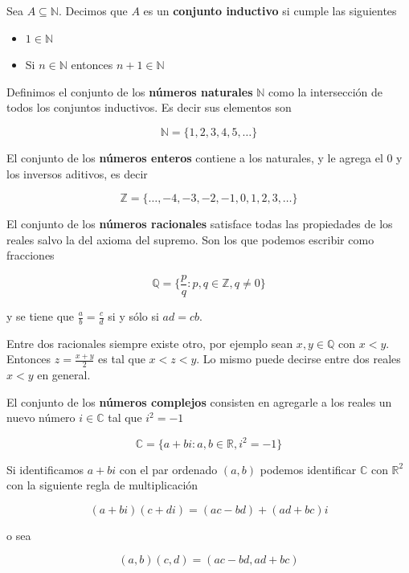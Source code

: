 \begin{definition} 
Sea $A \subseteq \mathbb{N}$.  Decimos que $A$ es un \textbf{conjunto inductivo} si cumple las siguientes

\begin{itemize}

\item $1 \in \mathbb{N}$

\item Si $n \in \mathbb{N}$ entonces $n+1 \in \mathbb{N}$

\end{itemize}

Definimos el conjunto de los \textbf{números naturales} $\mathbb{N}$ como la intersección de todos los conjuntos inductivos.  Es decir sus elementos son 

$$ \mathbb{N} = \{1,2,3,4,5, \ldots \} $$
\end{definition}

\begin{definition} 
El conjunto de los \textbf{números enteros} contiene a los naturales, y le agrega el $0$ y los inversos aditivos, es decir

$$ \mathbb{Z} = \{\ldots, -4,-3,-2,-1,0,1,2,3, \ldots \}$$
\end{definition}

\begin{definition} 
El conjunto de los \textbf{números racionales} satisface todas las propiedades de los reales salvo la del axioma del supremo.  Son los que podemos escribir como fracciones

$$ \mathbb{Q} = \{ \frac{p}{q} : p,q \in \mathbb{Z}, q \neq 0 \} $$

y se tiene que $\frac{a}{b} = \frac{c}{d}$ si y sólo si $ad = cb$.
	
Entre dos racionales siempre existe otro, por ejemplo sean $x,y \in \mathbb{Q}$ con $x < y$.  Entonces $z = \frac{x+y}{2}$ es tal que $x < z < y$.  Lo mismo puede decirse entre dos reales $x<y$ en general.
\end{definition}

\begin{definition} 
El conjunto de los \textbf{números complejos} consisten en agregarle a los reales un nuevo número $i \in \mathbb{C}$ tal que $i^2 = -1$

$$ \mathbb{C} = \{ a + b i : a,b \in \mathbb{R}, i^2 = -1 \}$$

Si identificamos $a+bi$ con el par ordenado $(a,b)$ podemos identificar $\mathbb{C}$ con $\mathbb{R}^2$ con la siguiente regla de multiplicación

$$ (a+bi)(c+di) = (ac - bd) + (ad + bc) i$$

o sea

$$ (a,b)(c,d) = (ac - bd, ad + bc)$$
\end{definition}



